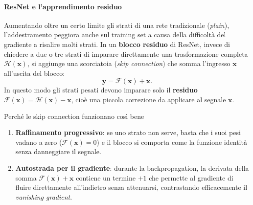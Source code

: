 \documentclass[12pt]{extarticle}
\begin{document}
\paragraph{ResNet e l'apprendimento residuo}
Aumentando oltre un certo limite gli strati di una rete tradizionale (\emph{plain}), l'addestramento peggiora anche sul training set a causa della difficoltà del gradiente a risalire molti strati. In un \textbf{blocco residuo} di ResNet, invece di chiedere a due o tre strati di imparare direttamente una trasformazione completa $\mathcal{H}(\mathbf{x})$, si aggiunge una scorciatoia (\emph{skip connection}) che somma l'ingresso $\mathbf{x}$ all'uscita del blocco:
\[
\mathbf{y} = \mathcal{F}(\mathbf{x}) + \mathbf{x}.
\]
In questo modo gli strati pesati devono imparare solo il \textbf{residuo} $\mathcal{F}(\mathbf{x}) = \mathcal{H}(\mathbf{x}) - \mathbf{x}$, cioè una piccola correzione da applicare al segnale $\mathbf{x}$.

\begin{center}
\end{center}

\begin{ideabox}{Perché le skip connection funzionano così bene}
\begin{enumerate}[1.]
    \item \textbf{Raffinamento progressivo}: se uno strato non serve, basta che i suoi pesi vadano a zero ($\mathcal{F}(\mathbf{x})=0$) e il blocco si comporta come la funzione identità senza danneggiare il segnale.
    \item \textbf{Autostrada per il gradiente}: durante la backpropagation, la derivata della somma $\mathcal{F}(\mathbf{x})+\mathbf{x}$ contiene un termine $+1$ che permette al gradiente di fluire direttamente all'indietro senza attenuarsi, contrastando efficacemente il \emph{vanishing gradient}.
\end{enumerate}
\end{ideabox}
\end{document}

